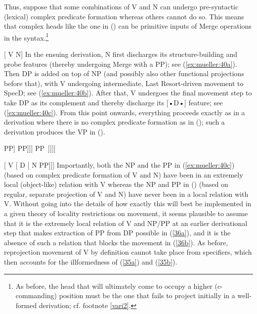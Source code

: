 \documentclass[output=paper
,modfonts
,nonflat]{langsci/langscibook}
\begin{document}
	Thus, suppose that some combinations of V and N can undergo
	pre-syntactic (lexical) complex predicate formation whereas others
	cannot do so. This means that complex heads like the one in (\Next) can
	be primitive inputs of Merge operations in the syntax.\footnote{As
		before, the head that will ultimately come to occupy a higher
		(c-commanding) position must be the one that fails to project initially in a
		well-formed derivation; cf. footnote \ref{vari2}.}
	
	\ea\relax\label{ex:mueller:39} {[} V N] \z
	In the ensuing derivation, N first discharges its structure-building
	and probe features (thereby undergoing Merge with a PP); see (\ref{ex:mueller:40a}).
	Then
	DP is added on top of NP (and possibly also other functional projections
	before that), with V undergoing intermediate, Last Resort-driven
	movement to SpecD; see (\ref{ex:mueller:40b}). After that, V undergoes the
	final  movement step to take DP as its complement and thereby
	discharge its [•D•] feature; see
	(\ref{ex:mueller:40c}). From this point onwards, everything proceeds exactly as in
	a derivation where there is no complex predicate formation as in
	(\Next); such a derivation produces the VP in (\NNext).\largerpage
	
	\ea\label{ex:mueller:40}
	\ea\label{ex:mueller:40a}\relax [\sub{NP} [\sub{N\sub{2}} V\sub{1} N\sub{2}] PP]
	\ex\label{ex:mueller:40b}\relax [\sub{DP} V\sub{1} [\sub{D$'$} D [\sub{NP} [\sub{N\sub{2}} t\sub{1} N\sub{2}] PP]]]
	\ex\label{ex:mueller:40c}\relax [\sub{VP} V\sub{1} [\sub{DP} t$'$\sub{1} [\sub{D$'$} D [\sub{NP} [\sub{N\sub{2}} t\sub{1} N\sub{2}] PP~]]]]
	\z
	\z
	
	\ea\label{ex:mueller:41} {[} V [ D [ N PP]]]\z
	Importantly, both the NP and the PP in (\ref{ex:mueller:40c}) (based on complex
	predicate formation of V and N) have been in an extremely local
	(object-like) relation with V whereas the NP and PP in (\Last) (based
	on regular, separate projection of V and N) have never been in a local
	relation with V. Without going into the details of how exactly this
	will best be implemented in a given theory of locality restrictions on movement, it
	seems plausible to assume that it is the extremely local relation of V
	and NP/PP at an earlier derivational step that makes extraction of PP
	from DP possible in  (\ref{36a}), and it is the absence of such a relation that blocks
	the movement in (\ref{36b}). As before, reprojection movement of V
	by definition cannot take place from specifiers, which then accounts
	for the illformedness of (\ref{35a}) and (\ref{35b}).
	
\end{document}
